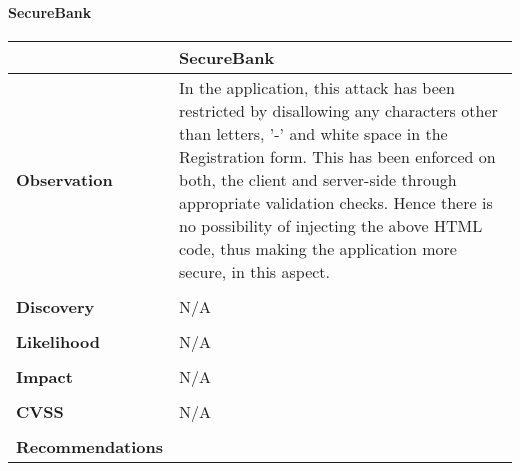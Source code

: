 \paragraph{SecureBank} \mbox{}
\begin{longtable*}{p{.30\textwidth} | p{.70\textwidth}}
    \hline
    & \textbf{SecureBank} \\
    \hline
    \textbf{Observation} &
        In the application, this attack has been restricted by disallowing any characters other than letters, '-' and white space in the Registration form.
        This has been enforced on both, the client and server-side through appropriate validation checks. Hence there is no possibility of injecting the above HTML code, thus making the application more secure, in this aspect.
    \\\\
    \textbf{Discovery} &
    	N/A
    \\\\
    \textbf{Likelihood} &
		N/A
    \\\\
    \textbf{Impact} &
      N/A
    \\\\
    \textbf{CVSS} &
      N/A
     \\\\
     \textbf{Recommendations} &
     \\
    \hline
\end{longtable*}
\clearpage